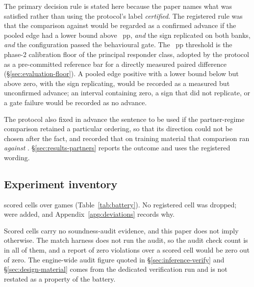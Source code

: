 The primary decision rule is stated here because the paper names what was satisfied rather than
using the protocol's label \emph{certified}. The registered rule was that the comparison against
\fcheap{} would be regarded as a confirmed advance if the pooled edge had a lower bound above
\vsevenPrimaryFloor{}~pp, \emph{and} the sign replicated on both banks, \emph{and} the
configuration passed the behavioural gate. The \vsevenPrimaryFloor{}~pp threshold is the phase-2
calibration floor of the principal responder class, adopted by the protocol as a pre-committed
reference bar for a directly measured paired difference (\S\ref{sec:evaluation-floor}). A pooled
edge positive with a lower bound below \vsevenPrimaryFloor{} but above zero, with the sign
replicating, would be recorded as a measured but unconfirmed advance; an interval containing zero,
a sign that did not replicate, or a gate failure would be recorded as no advance.

The protocol also fixed in advance the sentence to be used if the partner-regime comparison retained
a particular ordering, so that its direction could not be chosen after the fact, and recorded that on
training material that comparison ran \emph{against} \sestina{}. \S\ref{sec:results-partners}
reports the outcome and uses the registered wording.

\subsection{Experiment inventory}
\label{sec:design-battery}

\vsevenScoredCells{} scored cells over \vsevenScoredGames{} games (Table~\ref{tab:battery}). No registered cell was dropped;
\vsevenCellsAdded{} were added, and Appendix~\ref{app:deviations} records why.

\begin{table}[!ht]\centering
\caption{Every registered battery against what was measured. \emph{Registered} is the count the
protocol names, not the count that ran: two deviations add a reference cell and sixteen control cells,
because without them three of the protocol's own questions are not computable from the cells it
lists.}
\label{tab:battery}
{\tabfont}
\end{table}

Scored cells carry no soundness-audit evidence, and this paper does not imply otherwise. The match
harness does not run the audit, so the audit check count is \vsevenAuditChecks{} in all
\vsevenScoredCells{} of them, and a report of zero violations over a scored cell would be zero out of
zero. The engine-wide audit figure quoted in \S\ref{sec:inference-verify} and
\S\ref{sec:design-material} comes from the dedicated verification run and is not restated as a
property of the battery.
